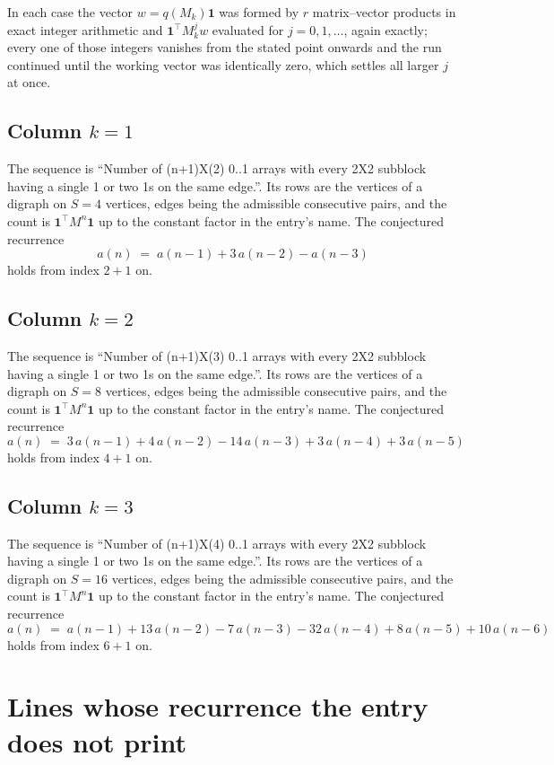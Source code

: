 \documentclass[11pt,a4paper]{article}
\theoremstyle{plain}
\theoremstyle{definition}
\begin{document}
In each case the vector $w=q(M_k)\mathbf{1}$ was formed by $r$ matrix--vector products in
exact integer arithmetic and $\mathbf{1}^{\!\top}M_k^{j}w$ evaluated for $j=0,1,\dots$,
again exactly; every one of those integers vanishes from the stated point onwards and the run
continued until the working vector was identically zero, which settles all larger $j$ at once.

\subsection*{Column $k$$=1$}
The sequence is ``Number of (n+1)X(2) 0..1 arrays with every 2X2 subblock having a single 1 or two 1s on the same edge.''. Its rows are the vertices of a digraph on
$S=4$ vertices, edges being the admissible consecutive pairs, and the count is
$\mathbf{1}^{\!\top}M^{n}\mathbf{1}$ up to the constant factor in the entry's name.
The conjectured recurrence
\[
a(n)\;=\;a(n-1) + 3\,a(n-2) - a(n-3)
\]
holds from index $2+1$ on.

\subsection*{Column $k$$=2$}
The sequence is ``Number of (n+1)X(3) 0..1 arrays with every 2X2 subblock having a single 1 or two 1s on the same edge.''. Its rows are the vertices of a digraph on
$S=8$ vertices, edges being the admissible consecutive pairs, and the count is
$\mathbf{1}^{\!\top}M^{n}\mathbf{1}$ up to the constant factor in the entry's name.
The conjectured recurrence
\[
a(n)\;=\;3\,a(n-1) + 4\,a(n-2) - 14\,a(n-3) + 3\,a(n-4) + 3\,a(n-5)
\]
holds from index $4+1$ on.

\subsection*{Column $k$$=3$}
The sequence is ``Number of (n+1)X(4) 0..1 arrays with every 2X2 subblock having a single 1 or two 1s on the same edge.''. Its rows are the vertices of a digraph on
$S=16$ vertices, edges being the admissible consecutive pairs, and the count is
$\mathbf{1}^{\!\top}M^{n}\mathbf{1}$ up to the constant factor in the entry's name.
The conjectured recurrence
\[
a(n)\;=\;a(n-1) + 13\,a(n-2) - 7\,a(n-3) - 32\,a(n-4) + 8\,a(n-5) + 10\,a(n-6)
\]
holds from index $6+1$ on.


\section{Lines whose recurrence the entry does not print}
\end{document}
